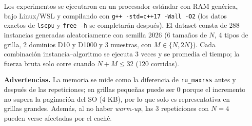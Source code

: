 Los experimentos se ejecutaron en un procesador estándar con RAM genérica, bajo Linux/WSL y compilando con \texttt{g++ -std=c++17 -Wall -O2} (los datos exactos de \texttt{lscpu} y \texttt{free -h} se completarán después). El dataset consta de 288 instancias generadas aleatoriamente con semilla 2026 (6 tamaños de $N$, 4 tipos de grilla, 2 dominios D10 y D1000 y 3 muestras, con $M\in\{N,2N\}$). Cada combinación instancia--algoritmo se ejecuta 3 veces y se promedia el tiempo; la fuerza bruta solo corre cuando $N+M\le 32$ (120 corridas).

\textbf{Advertencias.} La memoria se mide como la diferencia de \texttt{ru\_maxrss} antes y después de las repeticiones; en grillas pequeñas puede ser 0 porque el incremento no supera la paginación del SO (4 KB), por lo que solo es representativa en grillas grandes. Además, al no haber \textit{warm-up}, las 3 repeticiones con $N=4$ pueden verse afectadas por el caché.
